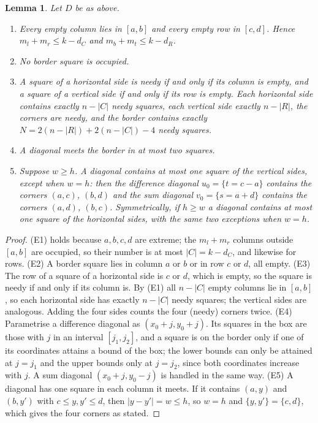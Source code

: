 \documentclass[11pt]{article}
\newtheorem{lemma}[theorem]{Lemma}
\theoremstyle{definition}
\theoremstyle{remark}
\newcommand{\dR}{d_R}
\newcommand{\dC}{d_C}
\begin{document}
\begin{lemma}\label{lem:facts}
Let $D$ be as above.
\begin{enumerate}
\item[(E1)] Every empty column lies in $[a,b]$ and every empty row in $[c,d]$. Hence
$m_l+m_r\le k-\dC$ and $m_b+m_t\le k-\dR$.
\item[(E2)] No border square is occupied.
\item[(E3)] A square of a horizontal side is needy if and only if its column is empty, and a square of a
vertical side if and only if its row is empty. Each horizontal side contains exactly $n-|C|$ needy
squares, each vertical side exactly $n-|R|$, the corners are needy, and the border contains exactly
$N=2(n-|R|)+2(n-|C|)-4$ needy squares.
\item[(E4)] A diagonal meets the border in at most two squares.
\item[(E5)] Suppose $w\ge h$. A diagonal contains at most one square of the vertical sides, except when
$w=h$: then the difference diagonal $u_0=\{t=c-a\}$ contains the corners $(a,c)$, $(b,d)$ and the sum
diagonal $v_0=\{s=a+d\}$ contains the corners $(a,d)$, $(b,c)$. Symmetrically, if $h\ge w$ a diagonal
contains at most one square of the horizontal sides, with the same two exceptions when $w=h$.
\end{enumerate}
\end{lemma}
\begin{proof}
(E1) holds because $a,b,c,d$ are extreme; the $m_l+m_r$ columns outside $[a,b]$ are occupied, so their
number is at most $|C|=k-\dC$, and likewise for rows. (E2) A border square lies in column $a$ or $b$ or
in row $c$ or $d$, all empty. (E3) The row of a square of a horizontal side is $c$ or $d$, which is
empty, so the square is needy if and only if its column is. By (E1) all $n-|C|$ empty columns lie in
$[a,b]$, so each horizontal side has exactly $n-|C|$ needy squares; the vertical sides are analogous.
Adding the four sides counts the four (needy) corners twice. (E4) Parametrise a difference diagonal as
$(x_0+j,y_0+j)$. Its squares in the box are those with $j$ in an interval $[j_1,j_2]$, and a square is on
the border only if one of its coordinates attains a bound of the box; the lower bounds can only be
attained at $j=j_1$ and the upper bounds only at $j=j_2$, since both coordinates increase with $j$. A
sum diagonal $(x_0+j,y_0-j)$ is handled in the same way. (E5) A diagonal has one square in each column it
meets. If it contains $(a,y)$ and $(b,y')$ with $c\le y,y'\le d$, then $|y-y'|=w\le h$, so $w=h$ and
$\{y,y'\}=\{c,d\}$, which gives the four corners as stated.
\end{proof}
\end{document}
